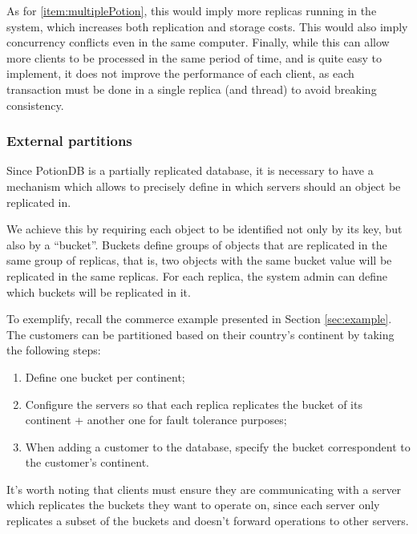 \documentclass{vldb}
\begin{document}
As for \ref{item:multiplePotion}, this would imply more replicas running in the system, which increases both replication and storage costs.
This would also imply concurrency conflicts even in the same computer.
Finally, while this can allow more clients to be processed in the same period of time, and is quite easy to implement, it does not improve the performance of each client, as each transaction must be done in a single replica (and thread) to avoid breaking consistency. %


\subsubsection{External partitions}

Since PotionDB is a partially replicated \cite{???} database, it is necessary to have a mechanism which allows to precisely define in which servers should an object be replicated in.

We achieve this by requiring each object to be identified not only by its key, but also by a ``bucket''.
Buckets define groups of objects that are replicated in the same group of replicas, that is, two objects with the same bucket value will be replicated in the same replicas.
For each replica, the system admin can define which buckets will be replicated in it.

To exemplify, recall the commerce example presented in Section \ref{sec:example}.
The customers can be partitioned based on their country's continent by taking the following steps: 

\begin{enumerate}
	\item Define one bucket per continent;
	\item Configure the servers so that each replica replicates the bucket of its continent + another one for fault tolerance purposes;
	\item When adding a customer to the database, specify the bucket correspondent to the customer's continent.
\end{enumerate}

It's worth noting that clients must ensure they are communicating with a server which replicates the buckets they want to operate on, since each server only replicates a subset of the buckets and doesn't forward operations to other servers.
\end{document}
